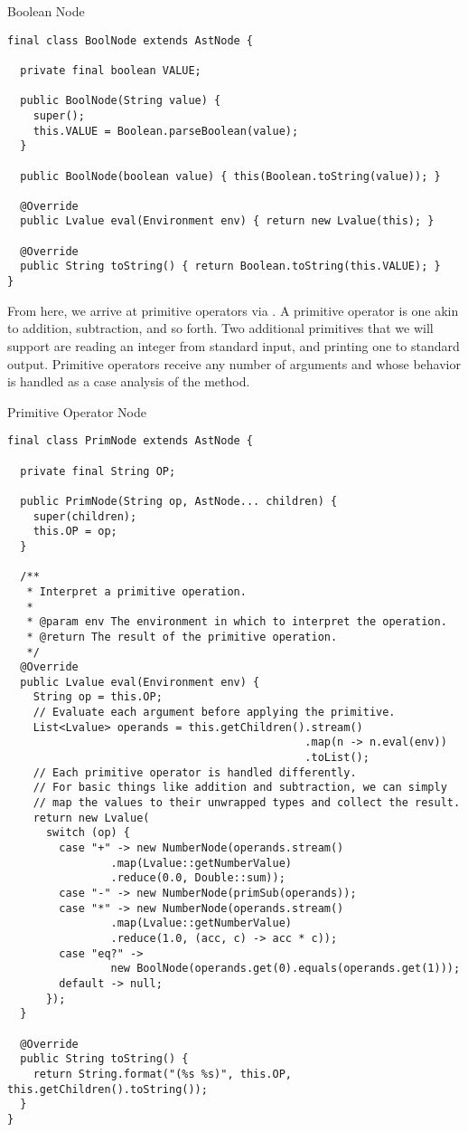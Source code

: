 \begin{cl}{Boolean Node}
\begin{lstlisting}[language=MyJava]
final class BoolNode extends AstNode {

  private final boolean VALUE;

  public BoolNode(String value) {
    super();
    this.VALUE = Boolean.parseBoolean(value);
  }

  public BoolNode(boolean value) { this(Boolean.toString(value)); }

  @Override
  public Lvalue eval(Environment env) { return new Lvalue(this); }

  @Override
  public String toString() { return Boolean.toString(this.VALUE); }
}
\end{lstlisting}
\end{cl}

From here, we arrive at primitive operators via . A primitive operator is one akin to addition, subtraction, and so forth. Two additional primitives that we will support are reading an integer from standard input, and printing one to standard output. Primitive operators receive any number of arguments and whose behavior is handled as a case analysis of the  method. 

\begin{cl}{Primitive Operator Node}
\begin{lstlisting}[language=MyJava]
final class PrimNode extends AstNode {

  private final String OP;

  public PrimNode(String op, AstNode... children) {
    super(children);
    this.OP = op;
  }

  /**
   * Interpret a primitive operation.
   *
   * @param env The environment in which to interpret the operation.
   * @return The result of the primitive operation.
   */
  @Override
  public Lvalue eval(Environment env) {
    String op = this.OP;
    // Evaluate each argument before applying the primitive.
    List<Lvalue> operands = this.getChildren().stream()
                                              .map(n -> n.eval(env))
                                              .toList();
    // Each primitive operator is handled differently.
    // For basic things like addition and subtraction, we can simply
    // map the values to their unwrapped types and collect the result.
    return new Lvalue(
      switch (op) {
        case "+" -> new NumberNode(operands.stream()
                .map(Lvalue::getNumberValue)
                .reduce(0.0, Double::sum));
        case "-" -> new NumberNode(primSub(operands));
        case "*" -> new NumberNode(operands.stream()
                .map(Lvalue::getNumberValue)
                .reduce(1.0, (acc, c) -> acc * c));
        case "eq?" ->
                new BoolNode(operands.get(0).equals(operands.get(1)));
        default -> null;
      });
  }

  @Override
  public String toString() {
    return String.format("(%s %s)", this.OP, this.getChildren().toString());
  }
}
\end{lstlisting}
\end{cl}

